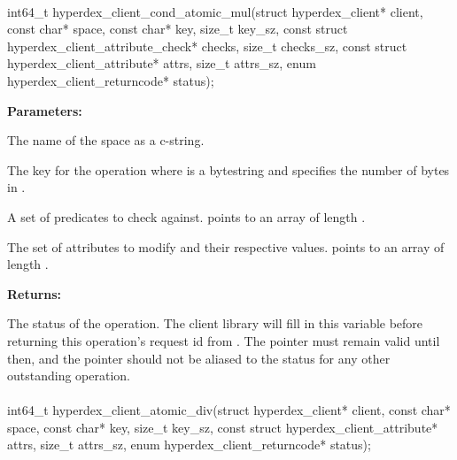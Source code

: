\paragraph{}
\label{api:c:cond_atomic_mul}
\begin{ccode}
int64_t hyperdex_client_cond_atomic_mul(struct hyperdex_client* client,
                const char* space,
                const char* key, size_t key_sz,
                const struct hyperdex_client_attribute_check* checks, size_t checks_sz,
                const struct hyperdex_client_attribute* attrs, size_t attrs_sz,
                enum hyperdex_client_returncode* status);
\end{ccode}
\funcdesc 

\noindent\textbf{Parameters:}
\begin{description}[labelindent=\widthof{{\code{checks}, \code{checks\_sz}}},leftmargin=*,noitemsep,nolistsep,align=right]
\item[\code{space}] The name of the space as a c-string.
\item[\code{key}, \code{key\_sz}] The key for the operation where  is a bytestring and  specifies the number of bytes in .
\item[\code{checks}, \code{checks\_sz}] A set of predicates to check against.   points to an array of length .
\item[\code{attrs}, \code{attrs\_sz}] The set of attributes to modify and their respective values.   points to an array of length .
\end{description}

\noindent\textbf{Returns:}
\begin{description}[labelindent=\widthof{{\code{status}}},leftmargin=*,noitemsep,nolistsep,align=right]
\item[\code{status}] The status of the operation.  The client library will fill in this variable before returning this operation's request id from .  The pointer must remain valid until then, and the pointer should not be aliased to the status for any other outstanding operation.
\end{description}

\paragraph{}
\label{api:c:atomic_div}
\begin{ccode}
int64_t hyperdex_client_atomic_div(struct hyperdex_client* client,
                const char* space,
                const char* key, size_t key_sz,
                const struct hyperdex_client_attribute* attrs, size_t attrs_sz,
                enum hyperdex_client_returncode* status);
\end{ccode}
\funcdesc 

